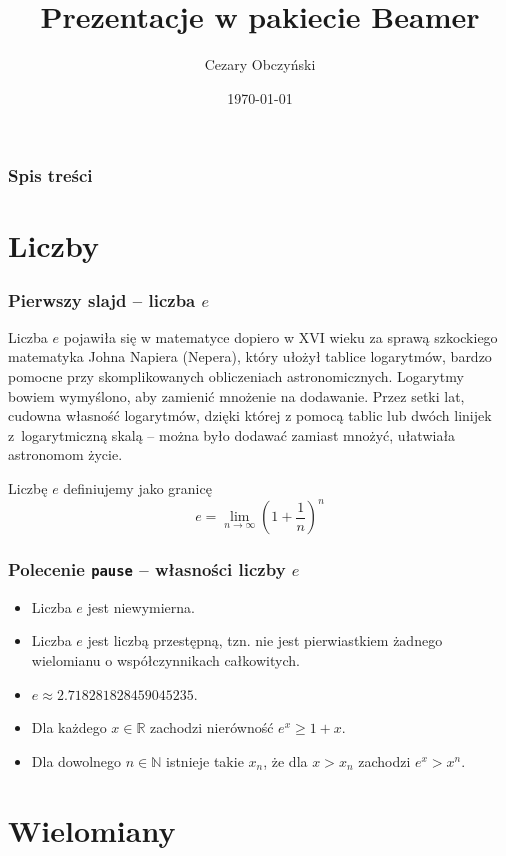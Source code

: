 \documentclass[10pt,xcolor={dvipsnames}]{beamer}
\title{Prezentacje w pakiecie Beamer}
\author{Cezary Obczyński}
\date{\today}
\begin{document}
\maketitle

\begin{frame}
	\frametitle{Spis treści}
	\tableofcontents
\end{frame}


\section{Liczby}

\begin{frame}
\frametitle{Pierwszy slajd -- liczba $e$}
Liczba $e$ pojawiła się w matematyce  dopiero w XVI wieku za sprawą szkockiego matematyka Johna Napiera (Nepera), który ułożył tablice logarytmów, bardzo pomocne przy skomplikowanych obliczeniach astronomicznych. Logarytmy bowiem wymyślono, aby zamienić mnożenie na dodawanie. Przez setki lat, cudowna własność logarytmów, dzięki której z pomocą tablic lub dwóch linijek z~logarytmiczną skalą -- można było dodawać zamiast mnożyć, ułatwiała astronomom życie. 

\bigskip
Liczbę $e$ definiujemy jako granicę
\begin{equation*}
e = \lim_{n\to \infty} \left(1+\frac{1}{n}\right)^n
\end{equation*}
\end{frame}


\begin{frame}
\frametitle{Polecenie \texttt{pause} -- własności liczby $e$}
\begin{itemize}
\item 
Liczba $e$ jest niewymierna.
\pause
\item 
Liczba $e$ jest liczbą przestępną, tzn. nie jest pierwiastkiem żadnego wielomianu o współczynnikach całkowitych.
\pause
\item $e \approx 2.718281828459045235$.
\pause
\item Dla każdego $x\in\mathbb{R}$ zachodzi nierówność $e^x \geq 1 + x$.
\pause
\item Dla dowolnego $n\in\mathbb{N}$ istnieje takie $x_n$, że dla
$x > x_n$ zachodzi $e^x > x^n$.
\end{itemize}
\end{frame}


\section{Wielomiany}
\end{document}
